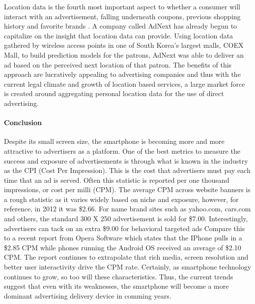 Location data is the fourth most important aspect to whether a consumer will interact with an advertisement, falling underneath coupons, previous shopping history and favorite brands \cite{Abi2012}. A company called AdNext has already begun to capitalize on the insight that location data can provide. Using location data gathered by wireless access points in one of South Korea’s largest malls, COEX Mall, to build prediction models for the patrons, AdNext was able to deliver an ad based on the perceived next location of that patron\cite{adn2012}. The benefits of this approach are lucratively appealing to advertising companies and thus with the current legal climate and growth of location based services, a large market force is created around aggregating personal location data for the use of direct advertising.


		\paragraph{Conclusion}
Despite its small screen size, the smartphone is becoming more and more attractive to advertisers as a platform.  
One of the best metrics to measure the success and exposure of advertisements is through what is known in the industry as the CPI (Cost Per Impression). 
This is the cost that advertisers must pay each time that an ad is served. Often this statistic is reported per one thousand impressions, or cost per milli (CPM). The average CPM across website banners is a rough statistic as it varies widely based on niche and exposure, however, for reference, in 2012 it was \$2.66\cite{adage}. For name brand sites such as yahoo.com, cars.com and others, the standard 300 X 250 advertisement is sold for \$7.00. Interestingly, advertisers can tack on an extra \$9.00 for behavioral targeted ads\cite{interactive_media} Compare this to a recent report from Opera Software which states that the IPhone pulls in a \$2.85 CPM while phones running the Android OS received an average of \$2.10 CPM\cite{opera}. The report continues to extrapolate that rich media, screen resolution and better user interactivity drive the CPM rate. Certainly, as smartphone technology continues to grow, so too will these characteristics. Thus, the current trends suggest that even with its weaknesses, the smartphone will become a more dominant advertising delivery device in comming years. 



